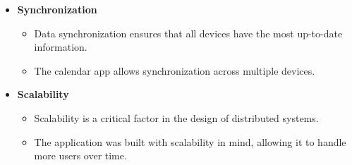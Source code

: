 \begin{itemize}
\begin{itemize}
        \end{itemize}
        \item \textbf{Synchronization}
        \begin{itemize}
            \item Data synchronization ensures that all devices have the most up-to-date information. 
            \item The calendar app allows synchronization across multiple devices.
        \end{itemize}
        \item \textbf{Scalability}
        \begin{itemize}
            \item Scalability is a critical factor in the design of distributed systems. 
            \item The application was built with scalability in mind, allowing it to handle more users over time.
        \end{itemize}
    \end{itemize}
